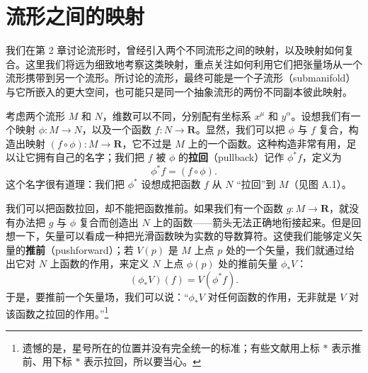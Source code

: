 
\chapter{流形之间的映射}

我们在第 2 章讨论流形时，曾经引入两个不同流形之间的映射，以及映射如何复合。这里我们将远为细致地考察这类映射，重点关注如何利用它们把张量场从一个流形携带到另一个流形。所讨论的流形，最终可能是一个子流形（submanifold）与它所嵌入的更大空间，也可能只是同一个抽象流形的两份不同副本彼此映射。

考虑两个流形 $M$ 和 $N$，维数可以不同，分别配有坐标系 $x^{\mu}$ 和 $y^{\alpha}$。设想我们有一个映射 $\phi : M \to N$，以及一个函数 $f : N \to \mathbf{R}$。显然，我们可以把 $\phi$ 与 $f$ 复合，构造出映射 $(f\circ\phi) : M \to \mathbf{R}$，它不过是 $M$ 上的一个函数。这种构造非常有用，足以让它拥有自己的名字；我们把 $f$ 被 $\phi$ 的\textbf{拉回}（pullback）记作 $\phi^{*}f$，定义为
\begin{equation*}
\phi^{*}f = (f\circ\phi).
\tag{A.1}
\end{equation*}
这个名字很有道理：我们把 $\phi^{*}$ 设想成把函数 $f$ 从 $N$ “拉回”到 $M$（见图 A.1）。


我们可以把函数拉回，却不能把函数推前。如果我们有一个函数 $g : M \to \mathbf{R}$，就没有办法把 $g$ 与 $\phi$ 复合而创造出 $N$ 上的函数——箭头无法正确地衔接起来。但是回想一下，矢量可以看成一种把光滑函数映为实数的导数算符。这使我们能够定义矢量的\textbf{推前}（pushforward）；若 $V(p)$ 是 $M$ 上点 $p$ 处的一个矢量，我们就通过给出它对 $N$ 上函数的作用，来定义 $N$ 上点 $\phi(p)$ 处的推前矢量 $\phi_{*}V$：
\begin{equation*}
(\phi_{*}V)(f) = V(\phi^{*}f).
\tag{A.2}
\end{equation*}
于是，要推前一个矢量场，我们可以说：“$\phi_{*}V$ 对任何函数的作用，无非就是 $V$ 对该函数之拉回的作用。”\footnote{遗憾的是，星号所在的位置并没有完全统一的标准；有些文献用上标 $*$ 表示推前、用下标 $*$ 表示拉回，所以要当心。}

